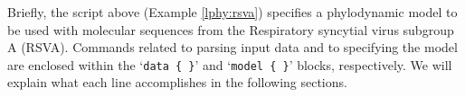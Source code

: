 \documentclass[10pt,letterpaper,table]{article}
\begin{document}
Briefly, the script above (Example \ref{lphy:rsva}) specifies a
phylodynamic model to be used with molecular sequences from the
Respiratory syncytial virus subgroup A (RSVA).
Commands related to parsing input data and to specifying the model are
enclosed within the `\texttt{data \{ \}}' and `\texttt{model \{ \}}'
blocks, respectively.
We will explain what each line accomplishes in the following sections.


 
\end{document}
